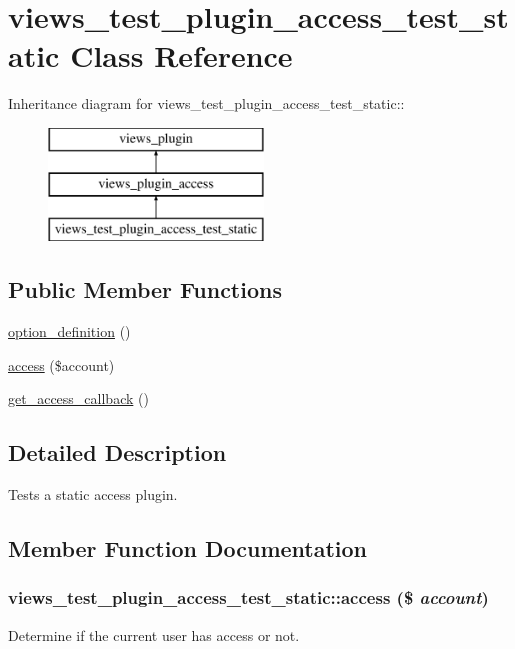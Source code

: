 \hypertarget{classviews__test__plugin__access__test__static}{
\section{views\_\-test\_\-plugin\_\-access\_\-test\_\-static Class Reference}
\label{classviews__test__plugin__access__test__static}
}
Inheritance diagram for views\_\-test\_\-plugin\_\-access\_\-test\_\-static::\begin{figure}[H]
\begin{center}
\leavevmode
\includegraphics[height=3cm]{classviews__test__plugin__access__test__static}
\end{center}
\end{figure}
\subsection*{Public Member Functions}
\begin{DoxyCompactItemize}
\item 
\hyperlink{classviews__test__plugin__access__test__static_a5b36ae87f1e4d92e04d02bb946a15330}{option\_\-definition} ()
\item 
\hyperlink{classviews__test__plugin__access__test__static_acb7d4c26172324fed2bf8e610f375b88}{access} (\$account)
\item 
\hyperlink{classviews__test__plugin__access__test__static_a4ddfff64a5cccae83c64e4c89095aeb6}{get\_\-access\_\-callback} ()
\end{DoxyCompactItemize}


\subsection{Detailed Description}
Tests a static access plugin. 

\subsection{Member Function Documentation}
\hypertarget{classviews__test__plugin__access__test__static_acb7d4c26172324fed2bf8e610f375b88}{
\subsubsection[{access}]{\setlength{\rightskip}{0pt plus 5cm}views\_\-test\_\-plugin\_\-access\_\-test\_\-static::access (\$ {\em account})}}
\label{classviews__test__plugin__access__test__static_acb7d4c26172324fed2bf8e610f375b88}
Determine if the current user has access or not. 


